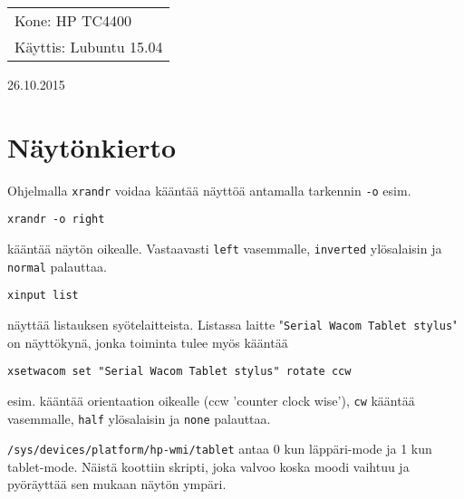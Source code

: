 \documentclass[main.tex]{subfiles}
\begin{document}
\thispagestyle{empty}
\begin{tabular}[t]{l}
Kone: HP TC4400\\
Käyttis: Lubuntu 15.04
\end{tabular}
\hfill 26.10.2015

{\section{Näytönkierto}}

Ohjelmalla \texttt{xrandr} voidaa kääntää näyttöä antamalla tarkennin \texttt{-o} esim.

\begin{lstlisting}
xrandr -o right
\end{lstlisting}

kääntää näytön oikealle. Vastaavasti \texttt{left} vasemmalle, \texttt{inverted} ylösalaisin ja \texttt{normal} palauttaa.

\begin{lstlisting}
xinput list
\end{lstlisting}

näyttää listauksen syötelaitteista. Listassa laitte "\texttt{Serial Wacom Tablet stylus}" on näyttökynä, jonka toiminta tulee myös kääntää

\begin{lstlisting}
xsetwacom set "Serial Wacom Tablet stylus" rotate ccw
\end{lstlisting}

esim. kääntää orientaation oikealle (ccw 'counter clock wise'), \texttt{cw} kääntää vasemmalle, \texttt{half} ylösalaisin ja \texttt{none} palauttaa.

\texttt{/sys/devices/platform/hp-wmi/tablet} antaa 0 kun läppäri-mode ja 1 kun tablet-mode. Näistä koottiin skripti, joka valvoo koska moodi vaihtuu ja pyöräyttää sen mukaan näytön ympäri.

\end{document}
